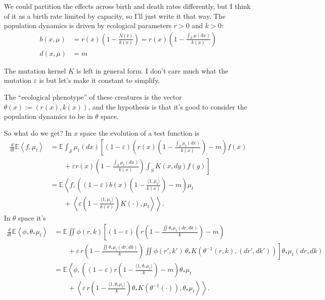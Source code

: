 \documentclass[11pt]{amsart}
\theoremstyle{remark}
\theoremstyle{definition}
\begin{document}
We could partition the effects across birth and death rates differently,
but I think of it as a birth rate limited by capacity, so I'll
just write it that way. The population dynamics is driven by
ecological parameters $r>0$ and $k>0$:
\begin{align*}
	b(x,\mu) &= r(x) \left( 1 - \frac{N(t)}{k(x)} \right) = r(x) \left( 1 - \frac{\int_{\mathcal{S}} \mu(dx)}{k(x)} \right) \\
	d(x,\mu) &= m
\end{align*}

The mutation kernel $K$ is left in general form.
I don't care much what the mutation $\varepsilon$ is but let's make it
constant to simplify.

The ``ecological phenotype'' of these creatures is the vector
$\theta(x) := (r(x),k(x))$, and the hypothesis is that it's good to
consider the population dynamics to be in $\theta$ space.

So what do we get? In $x$ space the evolution of a test function is
\begin{align*}
	\frac{d}{dt} \mathbb{E}\left\langle f, \mu_t \right\rangle 
	&= \mathbb{E} \int_{\mathcal{S}} \mu_t(dx) \left[ (1-\varepsilon) \left( r(x) \left( 1 - \frac{\int_{\mathcal{S}} \mu_t(dx)}{k(x)} \right) - m \right) f(x) \right. \\
	& \left. \qquad\mbox{} + \varepsilon r(x) \left( 1 - \frac{\int_{\mathcal{S}} \mu_t(dx)}{k(x)} \right) \int_{S} K(x,dy) f(y) \right] \\
	&= \mathbb{E}\left\langle f, \left( (1-\varepsilon) b(x) \left(1 - \frac{\langle 1,\mu_t\rangle}{k(x)} \right) - m \right) \mu_t \right. \\
	& \left. \qquad\mbox{} + \left\langle \varepsilon \left( 1 - \frac{\langle 1,\mu_t\rangle}{k(x)} \right) K(\cdot), \mu_t \right\rangle \right\rangle .
\end{align*}
%
In $\theta$ space it's
\begin{align*}
	\frac{d}{dt} \mathbb{E}\left\langle \phi, \theta_{*}\mu_t \right\rangle
	&= \mathbb{E} \iint \phi(r,k) \left[ (1-\varepsilon)
		\left( r \left( 1 - \frac{\iint \theta_{*}\mu_t(dr,dk)}{k} \right) - m \right) \right. \\
	& \left. \qquad\mbox{} + \varepsilon\, r \left( 1 - \frac{\iint \theta_{*}\mu_t(dr,dk)}{k} \right) \iint \phi(r',k')\, \theta_{*}K(\theta^{-1}(r,k),(dr',dk')) \right] \theta_{*}\mu_t(dr,dk) \\
	&= \mathbb{E}\left\langle \phi, 
		\left( (1-\varepsilon) r \left( 1 - \frac{\langle 1,\theta_{*}\mu_t\rangle}{k} \right) - m \right) \theta_*{\mu_t} \right. \\
	& \left. \qquad\mbox{} + \left\langle \varepsilon\, r \left( 1 - \frac{\langle 1,\theta_{*}\mu_t\rangle}{k} \right) \theta_{*}K(\theta^{-1}(\cdot)), \theta_{*}\mu_t \right\rangle \right\rangle .
\end{align*}
\end{document}
